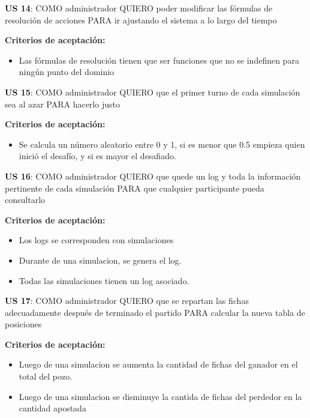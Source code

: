 \begin{tcolorbox}
\textbf{US 14}: COMO administrador QUIERO poder modificar las fórmulas de resolución de acciones PARA ir ajustando el sistema a lo largo del tiempo

\vline

\textbf{Criterios de aceptación:}
\begin{itemize}
\item Las fórmulas de resolución tienen que ser funciones que no se indefinen para ningún punto del dominio
\end{itemize}
\end{tcolorbox}
\vspace{10pt}


\begin{tcolorbox}
\textbf{US 15}: COMO administrador QUIERO que el primer turno de cada simulación sea al azar PARA hacerlo justo

\vline

\textbf{Criterios de aceptación:}
\begin{itemize}
\item Se calcula un número aleatorio entre 0 y 1, si es menor que 0.5 empieza quien inició el desafío, y si es mayor el desafiado.
\end{itemize}
\end{tcolorbox}
\vspace{10pt}

\begin{tcolorbox}
\textbf{US 16}: COMO administrador QUIERO que quede un log y toda la información pertinente de cada simulación PARA que cualquier participante pueda consultarlo

\vline

\textbf{Criterios de aceptación:}
\begin{itemize}
\item Los logs se corresponden con simulaciones 
\item Durante de una simulacion, se genera el log.
\item Todas las simulaciones tienen un log asociado.
\end{itemize}
\end{tcolorbox}
\vspace{10pt}

\begin{tcolorbox}
\textbf{US 17}: COMO administrador QUIERO que se repartan las fichas adecuadamente después de terminado el partido PARA calcular la nueva tabla de posiciones

\vline

\textbf{Criterios de aceptación:}
\begin{itemize}
\item Luego de una simulacion se aumenta la cantidad de fichas del ganador en el total del pozo.
\item Luego de una simulacion se disminuye la cantida de fichas del perdedor en la cantidad apostada
\end{itemize}
\end{tcolorbox}
\vspace{10pt}

